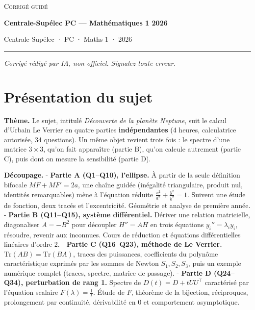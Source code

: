 \documentclass[11pt,a4paper]{article}
\begin{document}
\thispagestyle{plain}
\begin{center}
  {\small\scshape Corrigé guidé}\par\smallskip
  {\LARGE\bfseries Centrale-Supélec PC — Mathématiques 1 2026\par}\medskip
  {\large Centrale-Supélec · PC · Maths 1 · 2026\par}
\end{center}
\vspace{2pt}\hrule\vspace{8pt}

\emph{Corrigé rédigé par IA, non officiel. Signalez toute erreur.}

\hypertarget{pruxe9sentation-du-sujet}{%
\section{Présentation du sujet}\label{pruxe9sentation-du-sujet}}

\textbf{Thème.} Le sujet, intitulé \emph{Découverte de la planète Neptune}, suit le calcul d'Urbain Le Verrier en quatre parties \textbf{indépendantes} (4 heures, calculatrice autorisée, 34 questions). Un même objet revient trois fois : le spectre d'une matrice \(3\times3\), qu'on fait apparaître (partie B), qu'on calcule autrement (partie C), puis dont on mesure la sensibilité (partie D).

\textbf{Découpage.}
- \textbf{Partie A (Q1--Q10), l'ellipse.} À partir de la seule définition bifocale \(MF+MF'=2a\), une chaîne guidée (inégalité triangulaire, produit nul, identités remarquables) mène à l'équation réduite \(\frac{x^2}{a^2}+\frac{y^2}{b^2}=1\). Suivent une étude de fonction, deux tracés et l'excentricité. Géométrie et analyse de première année.
- \textbf{Partie B (Q11--Q15), système différentiel.} Dériver une relation matricielle, diagonaliser \(A=-B^2\) pour découpler \(H''=AH\) en trois équations \(y_i''=\lambda_iy_i\), résoudre, revenir aux inconnues. Cours de réduction et équations différentielles linéaires d'ordre 2.
- \textbf{Partie C (Q16--Q23), méthode de Le Verrier.} \(\mathrm{Tr}(AB)=\mathrm{Tr}(BA)\), traces des puissances, coefficients du polynôme caractéristique exprimés par les sommes de Newton \(S_1,S_2,S_3\), puis un exemple numérique complet (traces, spectre, matrice de passage).
- \textbf{Partie D (Q24--Q34), perturbation de rang 1.} Spectre de \(D(t)=D+tUU^\top\) caractérisé par l'équation scalaire \(F(\lambda)=\frac1t\). Étude de \(F\), théorème de la bijection, réciproques, prolongement par continuité, dérivabilité en \(0\) et comportement asymptotique.
\end{document}
